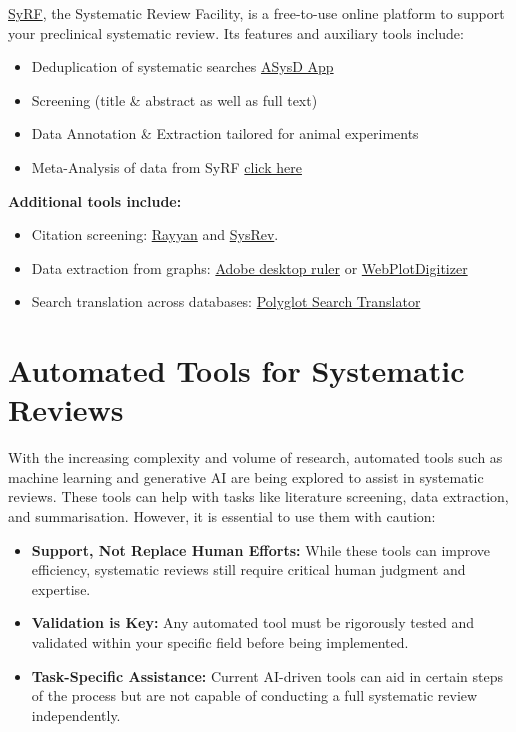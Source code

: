 \documentclass[
]{book}
\providecommand{\tightlist}{%
  \setlength{\itemsep}{0pt}\setlength{\parskip}{0pt}}
\begin{document}
\href{https://syrf.org.uk/}{SyRF}, the Systematic Review Facility, is a free-to-use online platform to support your preclinical systematic review. Its features and auxiliary tools include:

\begin{itemize}
\tightlist
\item
  Deduplication of systematic searches \href{https://camarades.shinyapps.io/RDedup/}{ASysD App}
\item
  Screening (title \& abstract as well as full text)
\item
  Data Annotation \& Extraction tailored for animal experiments
\item
  Meta-Analysis of data from SyRF \href{https://camarades.shinyapps.io/meta-analysis-app/}{click here}
\end{itemize}

\textbf{Additional tools include:}

\begin{itemize}
\tightlist
\item
  Citation screening: \href{https://rayyan.qcri.org/welcome}{Rayyan} and \href{https://sysrev.com/}{SysRev}.
\item
  Data extraction from graphs: \href{https://helpx.adobe.com/acrobat/using/grids-guides-measurements-pdfs.html}{Adobe desktop ruler} or \href{https://automeris.io/WebPlotDigitizer/}{WebPlotDigitizer}
\item
  Search translation across databases: \href{https://sr-accelerator.com/\#/polyglot}{Polyglot Search Translator}
\end{itemize}

\section{Automated Tools for Systematic Reviews}\label{automated-tools-for-systematic-reviews}

With the increasing complexity and volume of research, automated tools such as machine learning and generative AI are being explored to assist in systematic reviews. These tools can help with tasks like literature screening, data extraction, and summarisation. However, it is essential to use them with caution:

\begin{itemize}
\tightlist
\item
  \textbf{Support, Not Replace Human Efforts:} While these tools can improve efficiency, systematic reviews still require critical human judgment and expertise.
\item
  \textbf{Validation is Key:} Any automated tool must be rigorously tested and validated within your specific field before being implemented.
\item
  \textbf{Task-Specific Assistance:} Current AI-driven tools can aid in certain steps of the process but are not capable of conducting a full systematic review independently.
\end{itemize}
\end{document}

